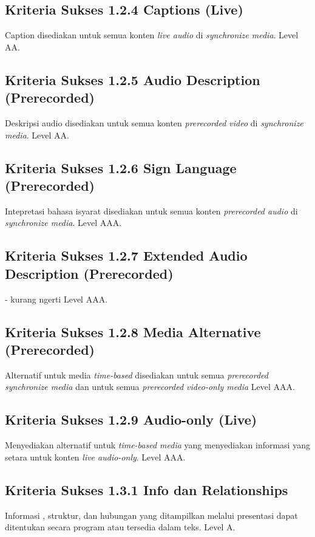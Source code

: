 \subsection{Kriteria Sukses 1.2.4 Captions (Live)}
\label{sec:kriteria_1.2.4}
Caption disediakan untuk semua konten \textit{live audio} di \textit{synchronize media}.
Level AA.

\subsection{Kriteria Sukses 1.2.5 Audio Description (Prerecorded)}
\label{sec:kriteria_1.2.5}
Deskripsi audio disediakan untuk semua konten \textit{prerecorded video} di \textit{synchronize media}.
Level AA.

\subsection{Kriteria Sukses 1.2.6 Sign Language (Prerecorded)}
\label{sec:kriteria_1.2.6}
Intepretasi bahasa isyarat disediakan untuk semua konten \textit{prerecorded audio} di \textit{synchronize media}.
Level AAA.

\subsection{Kriteria Sukses 1.2.7 Extended Audio Description (Prerecorded)}
\label{sec:kriteria_1.2.7}
- kurang ngerti
Level AAA.

\subsection{Kriteria Sukses 1.2.8 Media Alternative (Prerecorded)}
\label{sec:kriteria_1.2.8}
Alternatif untuk media \textit{time-based} disediakan untuk semua \textit{prerecorded synchronize media} dan untuk semua \textit{prerecorded video-only media}
Level AAA.

\subsection{Kriteria Sukses 1.2.9 Audio-only (Live)}
\label{sec:kriteria_1.2.9}
Menyediakan alternatif untuk \textit{time-based media} yang menyediakan informasi yang setara untuk konten \textit{live audio-only}.
Level AAA.

\subsection{Kriteria Sukses 1.3.1 Info dan Relationships}
\label{sec:kriteria_1.3.1}
Informasi , struktur, dan hubungan yang ditampilkan melalui presentasi dapat ditentukan secara program atau tersedia dalam teks.
Level A.


